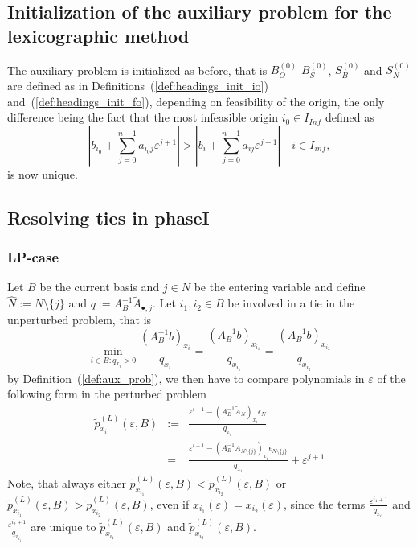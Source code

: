\documentclass[a4paper]{article}
\newcommand{\xe}[1]{\ensuremath{x_{#1}(\varepsilon)}}
\begin{document}
\subsection{Initialization of the auxiliary problem for the lexicographic
method}
The auxiliary problem is initialized as before, that is $B_{O}^{(0)}$
$B_{S}^{(0)}$, $S_{B}^{(0)}$ and $S_{N}^{(0)}$ are defined as in
Definitions~(\ref{def:headings_init_io}) and~(\ref{def:headings_init_fo}),
depending on feasibility of the origin, the only difference being
the fact that the most infeasible origin $i_{0} \in I_{Inf}$ defined as
\begin{equation*}
  \left|b_{i_{0}} + \sum_{j=0}^{n-1}a_{i_{0}j}\varepsilon^{j+1} \right|
    >
    \left|b_{i} + \sum_{j=0}^{n-1}a_{ij}\varepsilon^{j+1} \right|
    \quad i \in I_{inf},
\end{equation*}
is now unique.

\subsection{Resolving ties in phaseI}
\label{sec:Res_ties_phaseI}
\subsubsection{LP-case}
Let $B$ be the current basis and $j \in N$ be the entering variable
and define $\hat{N}:= N \setminus\{j\}$ and
$q:= A_{B}^{-1}\tilde{A}_{\bullet,j}$.
Let $i_{1}, i_{2} \in B$ be
involved in a tie in the unperturbed problem, that is
\begin{equation*}
  \min_{i \in B: q_{x_{i}} > 0}
  \frac{\left(A_{B}^{-1}b\right)_{x_{i}}}{q_{x_{i}}}
  =
  \frac{\left(A_{B}^{-1}b\right)_{x_{i_{1}}}}{q_{x_{i_{1}}}}
  =
  \frac{\left(A_{B}^{-1}b\right)_{x_{i_{2}}}}{q_{x_{i_{2}}}}
\end{equation*}
by Definition~(\ref{def:aux_prob}),  we then have to compare
polynomials in $\varepsilon$ of the following form in the perturbed problem
\begin{eqnarray}
\tilde{p}_{x_{i}}^{(L)}\left(\varepsilon, B\right) & := &
  \frac{\varepsilon^{i+1}
  - \left(A_{B}^{-1}\tilde{A}_{N}\right)_{x_{i}}
  \epsilon_{N}}{q_{x_{i}}} \nonumber \\
\label{def:p_x_i_tilde}
 & = &
  \frac{\varepsilon^{i+1}
  - \left(A_{B}^{-1}\tilde{A}_{N \setminus \{j\}}\right)_{x_{i}}
  \epsilon_{N \setminus \{j\}}}{q_{x_{i}}}
  + \varepsilon^{j+1}
\end{eqnarray}
Note, that always either $\tilde{p}_{x_{i_{1}}}^{(L)}
\left(\varepsilon, B\right) <
\tilde{p}_{x_{i_{2}}}^{(L)}\left(\varepsilon, B\right)$ or
$\tilde{p}_{x_{i_{1}}}^{(L)}\left(\varepsilon, B\right) >
\tilde{p}_{x_{i_{2}}}^{(L)}\left(\varepsilon, B\right)$, even if
$\xe{i_{1}} = \xe{i_{2}}$,
since the terms $\frac{\varepsilon^{i_{1}+1}}{q_{x_{i_{1}}}}$ and
$\frac{\varepsilon^{i_{2}+1}}{q_{x_{i_{1}}}}$ are unique to
$\tilde{p}_{x_{i_{1}}}^{(L)}\left(\varepsilon, B\right)$ and
$\tilde{p}_{x_{i_{2}}}^{(L)}\left(\varepsilon, B\right)$. 
\end{document}
